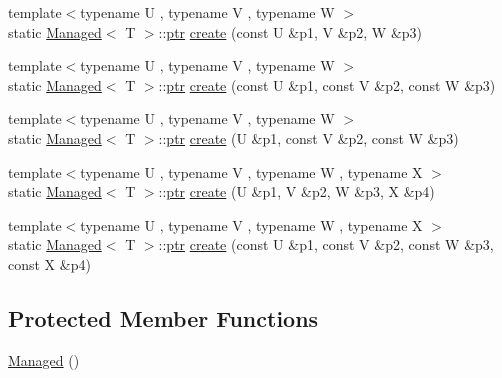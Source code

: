 \begin{DoxyCompactItemize}
\item 
{\footnotesize template$<$typename U , typename V , typename W $>$ }\\static \hyperlink{class_managed}{Managed}$<$ T $>$\-::\hyperlink{class_managed_a59aa857eaf753735f65130812e98e9a9}{ptr} \hyperlink{class_managed_a71481fb438808e332f846ebc70b9a2fe}{create} (const U \&p1, V \&p2, W \&p3)
\item 
{\footnotesize template$<$typename U , typename V , typename W $>$ }\\static \hyperlink{class_managed}{Managed}$<$ T $>$\-::\hyperlink{class_managed_a59aa857eaf753735f65130812e98e9a9}{ptr} \hyperlink{class_managed_ac1a0a120323e48426a0887c30dc4c55e}{create} (const U \&p1, const V \&p2, const W \&p3)
\item 
{\footnotesize template$<$typename U , typename V , typename W $>$ }\\static \hyperlink{class_managed}{Managed}$<$ T $>$\-::\hyperlink{class_managed_a59aa857eaf753735f65130812e98e9a9}{ptr} \hyperlink{class_managed_aada8c757392aa9aff2c6e8ce4ad87012}{create} (U \&p1, const V \&p2, const W \&p3)
\item 
{\footnotesize template$<$typename U , typename V , typename W , typename X $>$ }\\static \hyperlink{class_managed}{Managed}$<$ T $>$\-::\hyperlink{class_managed_a59aa857eaf753735f65130812e98e9a9}{ptr} \hyperlink{class_managed_a38b269222b373a3c50a8688ff8b1e3c4}{create} (U \&p1, V \&p2, W \&p3, X \&p4)
\item 
{\footnotesize template$<$typename U , typename V , typename W , typename X $>$ }\\static \hyperlink{class_managed}{Managed}$<$ T $>$\-::\hyperlink{class_managed_a59aa857eaf753735f65130812e98e9a9}{ptr} \hyperlink{class_managed_a4fc6d4ba750377cdafb93711da1c2096}{create} (const U \&p1, const V \&p2, const W \&p3, const X \&p4)
\end{DoxyCompactItemize}
\subsection*{Protected Member Functions}
\begin{DoxyCompactItemize}
\item 
\hyperlink{class_managed_ad77d963880226adfaa67a54f00839688}{Managed} ()
\end{DoxyCompactItemize}


